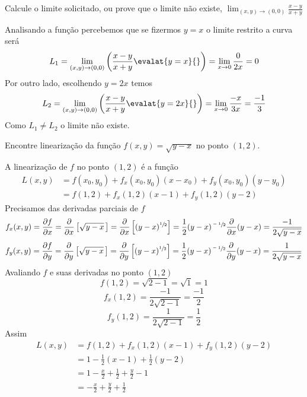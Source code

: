 \documentclass[a4paper,12pt,fleqn]{article}
\newcommand{\D}[2]{\frac{\partial {#1}}{\partial {#2}}}
\begin{document}

Calcule o limite solicitado, ou prove que o limite não existe,
\(
  \lim_{(x, y)\to(0, 0)} \frac{x-y}{x+y}
\)

\begin{answer}
  Analisando a função percebemos que se fizermos $y=x$ o limite restrito
  a curva será
  \[
    L_1
    = \lim_{(x, y)\to(0, 0)} \left(\frac{x-y}{x+y} \evalat{y=x}{}\right)
    = \lim_{x\to 0} \frac{0}{2x} = 0
  \]
  Por outro lado, escolhendo $y=2x$ temos
  \[
    L_2
    = \lim_{(x, y)\to(0, 0)} \left(\frac{x-y}{x+y} \evalat{y=2x}{}\right)
    = \lim_{x\to 0} \frac{-x}{3x}
    = \frac{-1}{3}
  \]
  Como $L_1\neq L_2$ o limite não existe.
  \clearpage
\end{answer}

Encontre linearização da função
\(
f(x, y) = \sqrt{y-x}
\)
no ponto \((1, 2)\).

\begin{answer}
  A linearização de $f$ no ponto \((1, 2)\) é a função
  \begin{align*}
    L(x, y)
    & = f(x_0, y_0) + f_x(x_0, y_0)(x-x_0) + f_y(x_0, y_0)(y-y_0) \\
    & = f(1, 2) + f_x(1, 2)(x-1) + f_y(1, 2)(y-2)
  \end{align*}
  Precisamos das derivadas parciais de $f$
  \[
    f_x(x, y)
    = \D{f}{x}
    = \D{}{x}\left[\sqrt{y-x}\,\right]
    = \D{}{x}\left[(y-x)^{\sfrac{1}{2}}\right]
    = \frac{1}{2}(y-x)^{\sfrac{-1}{2}}\D{}{x}(y-x)
    = \frac{-1}{2\sqrt{y-x}}
  \]
  \[
    f_y(x, y)
    = \D{f}{y}
    = \D{}{y}\left[\sqrt{y-x}\,\right]
    = \D{}{y}\left[(y-x)^{\sfrac{1}{2}}\right]
    = \frac{1}{2}(y-x)^{\sfrac{-1}{2}}\D{}{y}(y-x)
    = \frac{1}{2\sqrt{y-x}}
  \]
  Avaliando $f$ e suas derivadas no ponto $(1, 2)$
  \[
    f(1, 2)
    = \sqrt{2-1}
    = \sqrt{1}
    = 1
  \]
  \[
    f_x(1, 2)
    = \frac{-1}{2\sqrt{2-1}}
    = \frac{-1}{2}
  \]
  \[
    f_y(1, 2)
    = \frac{1}{2\sqrt{2-1}}
    = \frac{1}{2}
  \]
  Assim
  \begin{align*}
    L(x, y)
    & = f(1, 2) + f_x(1, 2)(x-1) + f_y(1, 2)(y-2) \\
    & = 1 -\frac{1}{2}(x-1) + \frac{1}{2}(y-2) \\
    & = 1 -\frac{x}{2} + \frac{1}{2} + \frac{y}{2} - 1 \\
    & = -\frac{x}{2} + \frac{y}{2} + \frac{1}{2}
  \end{align*}
  \clearpage
\end{answer}
\end{document}
